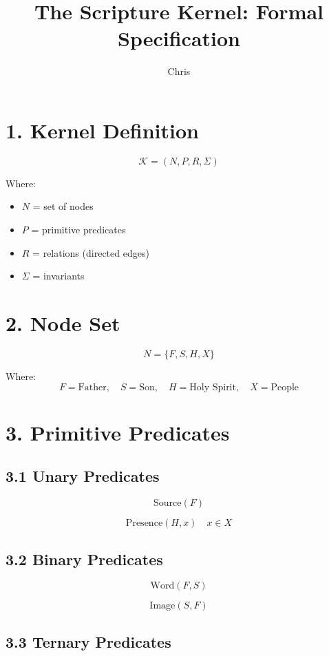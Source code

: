 \documentclass[12pt]{article}
\title{The Scripture Kernel: Formal Specification}
\author{Chris}
\date{}
\begin{document}
\maketitle

\section*{1. Kernel Definition}

\[
\mathcal{K} = (N, P, R, \Sigma)
\]

\noindent
Where:
\begin{itemize}
    \item $N$ = set of nodes
    \item $P$ = primitive predicates
    \item $R$ = relations (directed edges)
    \item $\Sigma$ = invariants
\end{itemize}

\section*{2. Node Set}

\[
N = \{F, S, H, X\}
\]

\noindent
Where:
\[
F = \text{Father}, \quad
S = \text{Son}, \quad
H = \text{Holy Spirit}, \quad
X = \text{People}
\]

\section*{3. Primitive Predicates}

\subsection*{3.1 Unary Predicates}

\[
\mathrm{Source}(F)
\]

\[
\mathrm{Presence}(H, x) \quad x \in X
\]

\subsection*{3.2 Binary Predicates}

\[
\mathrm{Word}(F, S)
\]

\[
\mathrm{Image}(S, F)
\]

\subsection*{3.3 Ternary Predicates}
\end{document}
